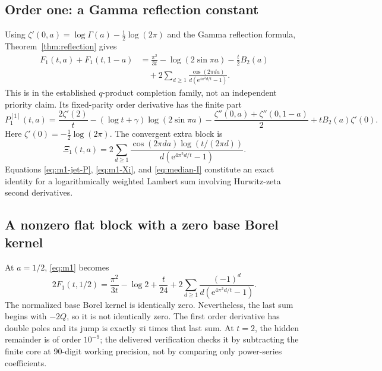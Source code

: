 \documentclass[11pt,a4paper]{article}
\numberwithin{equation}{section}
\theoremstyle{definition}\newtheorem{definition}[theorem]{Definition}
\theoremstyle{remark}\newtheorem{remark}[theorem]{Remark}
\newcommand{\ii}{\mathrm i}\newcommand{\e}{\mathrm e}
\begin{document}
\subsection{Order one: a Gamma reflection constant}
Using $\zeta'(0,a)=\log\Gamma(a)-\tfrac12\log(2\pi)$ and the Gamma
reflection formula, Theorem~\ref{thm:reflection} gives
\begin{equation}
 \begin{split}
 F_1(t,a)+F_1(t,1-a)
 &=\frac{\pi^2}{3t}-\log(2\sin\pi a)-\frac t2B_2(a)\\
 &\quad+2\sum_{d\ge1}\frac{\cos(2\pi da)}{d(\e^{4\pi^2d/t}-1)}.
 \end{split}
 \label{eq:m1}
\end{equation}
This is in the established $q$-product completion family, not an
independent priority claim. Its fixed-parity order derivative has the
finite part
\begin{equation}
 P_1^{[1]}(t,a)=\frac{2\zeta'(2)}t
  -(\log t+\gamma)\log(2\sin\pi a)
  -\frac{\zeta''(0,a)+\zeta''(0,1-a)}2
  +tB_2(a)\zeta'(0).
 \label{eq:m1-jet-P}
\end{equation}
Here $\zeta'(0)=-\tfrac12\log(2\pi)$. The convergent extra block is
\begin{equation}
 \Xi_1(t,a)=2\sum_{d\ge1}
 \frac{\cos(2\pi da)\log(t/(2\pi d))}{d(\e^{4\pi^2d/t}-1)}.
 \label{eq:m1-Xi}
\end{equation}
Equations \eqref{eq:m1-jet-P}, \eqref{eq:m1-Xi}, and
\eqref{eq:median-I} constitute an exact identity for a logarithmically
weighted Lambert sum involving Hurwitz-zeta second derivatives.

\subsection{A nonzero flat block with a zero base Borel kernel}
At $a=1/2$, \eqref{eq:m1} becomes
\begin{equation}
 2F_1(t,1/2)=\frac{\pi^2}{3t}-\log2+\frac{t}{24}
              +2\sum_{d\ge1}\frac{(-1)^d}{d(\e^{4\pi^2d/t}-1)}.
 \label{eq:half}
\end{equation}
The normalized base Borel kernel is identically zero. Nevertheless,
the last sum begins with $-2Q$, so it is not identically zero.
The first order derivative has double poles and its jump is exactly
$\pi\ii$ times that last sum. At $t=2$, the hidden remainder is of
order $10^{-9}$; the delivered verification checks it by subtracting
the finite core at 90-digit working precision, not by comparing only
power-series coefficients.
\end{document}
